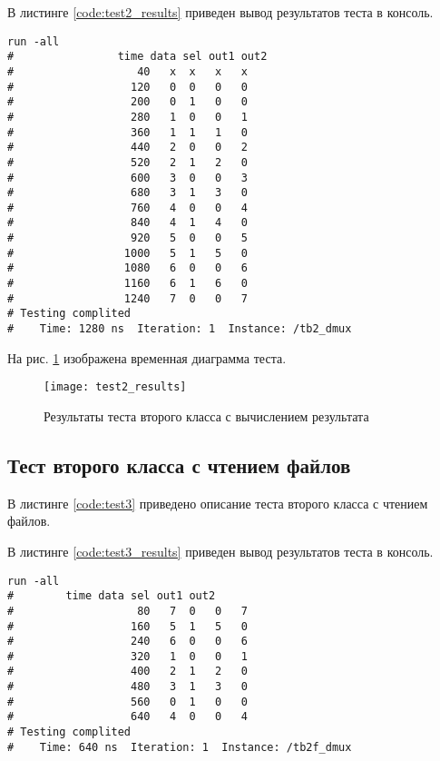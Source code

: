 В листинге \ref{code:test2_results} приведен вывод результатов теста в консоль.
\begin{lstlisting}[caption=Результаты теста второго класса с вычислением результата, label=code:test2_results, language={}]
run -all
# 		         time data sel out1 out2
#                   40   x  x   x   x
#                  120   0  0   0   0
#                  200   0  1   0   0
#                  280   1  0   0   1
#                  360   1  1   1   0
#                  440   2  0   0   2
#                  520   2  1   2   0
#                  600   3  0   0   3
#                  680   3  1   3   0
#                  760   4  0   0   4
#                  840   4  1   4   0
#                  920   5  0   0   5
#                 1000   5  1   5   0
#                 1080   6  0   0   6
#                 1160   6  1   6   0
#                 1240   7  0   0   7
# Testing complited
#    Time: 1280 ns  Iteration: 1  Instance: /tb2_dmux
\end{lstlisting}

На рис. \ref{fig:test2_results} изображена временная диаграмма теста.
\begin{figure}[H]
	\begin{center}
		\texttt{[image: test2\_results]}
		\caption{Результаты теста второго класса с вычислением результата}
		\label{fig:test2_results}
	\end{center}
\end{figure}
\vspace{-1cm}

\subsection{Тест второго класса с чтением файлов}

В листинге \ref{code:test3} приведено описание теста второго класса с чтением файлов.


В листинге \ref{code:test3_results} приведен вывод результатов теста в консоль.
\begin{lstlisting}[caption=Результаты теста второго класса с чтением файлов, label=code:test3_results, language={}]
run -all
# 		 time data sel out1 out2
#                   80   7  0   0   7
#                  160   5  1   5   0
#                  240   6  0   0   6
#                  320   1  0   0   1
#                  400   2  1   2   0
#                  480   3  1   3   0
#                  560   0  1   0   0
#                  640   4  0   0   4
# Testing complited
#    Time: 640 ns  Iteration: 1  Instance: /tb2f_dmux
\end{lstlisting}

